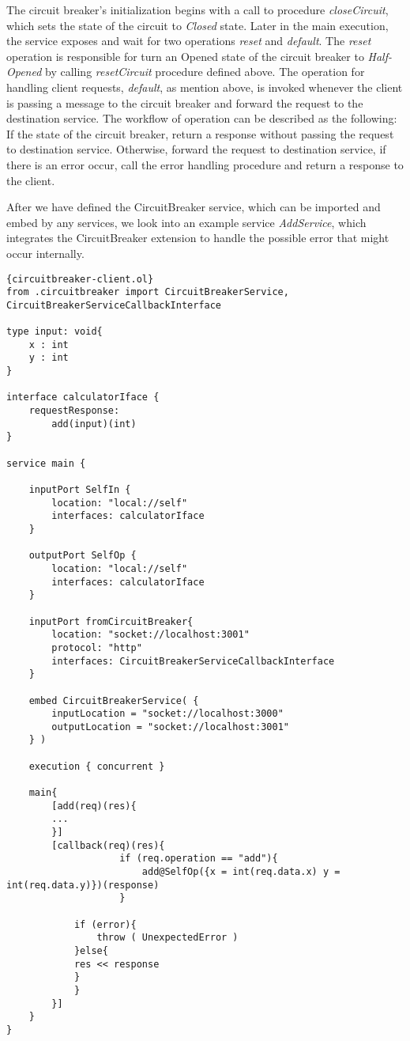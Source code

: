The circuit breaker's initialization begins with a call to procedure \textit{closeCircuit}, which sets the state of the circuit to \textit{Closed} state. Later in the main execution, the service exposes and wait for two operations \textit{reset} and \textit{default}. The \textit{reset} operation is responsible for turn an Opened state of the circuit breaker to \textit{Half-Opened} by calling \textit{resetCircuit} procedure defined above. The operation for handling client requests, \textit{default}, as mention above, is invoked whenever the client is passing a message to the circuit breaker and forward the request to the destination service. The workflow of operation can be described as the following:
If the state of the circuit breaker, return a response without passing the request to destination service.
Otherwise, forward the request to destination service, if there is an error occur, call the error handling procedure and return a response to the client.

After we have defined the CircuitBreaker service, which can be imported and embed by any services, we look into an example service \textit{AddService}, which integrates the CircuitBreaker extension to handle the possible error that might occur internally. 

\begin{listing}[ht]
    \lstset{language=Jolie,
        style=codeStyle,
        numbers=left,
        firstnumber=1
    }
    \begin{lstlisting}[frame=tlrb,
basicstyle=\footnotesize]{circuitbreaker-client.ol}
from .circuitbreaker import CircuitBreakerService, CircuitBreakerServiceCallbackInterface

type input: void{
    x : int
    y : int
}

interface calculatorIface {
    requestResponse: 
        add(input)(int)
}

service main {

    inputPort SelfIn {
        location: "local://self"
        interfaces: calculatorIface
    }

    outputPort SelfOp {
        location: "local://self"
        interfaces: calculatorIface
    }

    inputPort fromCircuitBreaker{
        location: "socket://localhost:3001"
        protocol: "http"
        interfaces: CircuitBreakerServiceCallbackInterface
    }

    embed CircuitBreakerService( { 
        inputLocation = "socket://localhost:3000"
        outputLocation = "socket://localhost:3001" 
    } )

    execution { concurrent }

    main{
        [add(req)(res){
		...
        }]
        [callback(req)(res){
                    if (req.operation == "add"){
                        add@SelfOp({x = int(req.data.x) y = int(req.data.y)})(response)               
                    }       

		    if (error){
	    		throw ( UnexpectedError )
		    }else{
			res << response
         	}                  
            }
        }]
    }
}
\end{lstlisting}
\end{listing}


